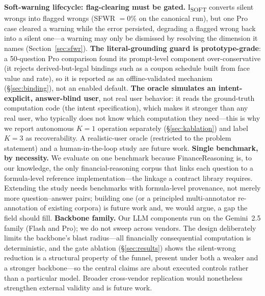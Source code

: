 \textbf{Soft-warning lifecycle: flag-clearing must be gated.} I\textsubscript{SOFT} converts silent wrongs into flagged wrongs (SFWR $=0\%$ on the canonical run), but one Pro case cleared a warning while the error persisted, degrading a flagged wrong back into a silent one---a warning may only be dismissed by resolving the dimension it names (Section~\ref{sec:sfwr}).
\textbf{The literal-grounding guard is prototype-grade}: a 50-question Pro comparison found its prompt-level component over-conservative (it rejects derived-but-legal bindings such as a coupon schedule built from face value and rate), so it is reported as an offline-validated mechanism (\S\ref{sec:binding}), not an enabled default.
\textbf{The oracle simulates an intent-explicit, answer-blind user}, not real user behavior: it reads the ground-truth computation code (the intent specification), which makes it stronger than any real user, who typically does not know which computation they need---this is why we report autonomous $K{=}1$ operation separately (\S\ref{sec:kablation}) and label $K{=}3$ as recoverability. A realistic-user oracle (restricted to the problem statement) and a human-in-the-loop study are future work.
\textbf{Single benchmark, by necessity.} We evaluate on one benchmark because FinanceReasoning is, to our knowledge, the only financial-reasoning corpus that links each question to a formula-level reference implementation---the linkage a contract library requires. Extending the study needs benchmarks with formula-level provenance, not merely more question--answer pairs; building one (or a principled multi-annotator re-annotation of existing corpora) is future work and, we would argue, a gap the field should fill.
\textbf{Backbone family.} Our LLM components run on the Gemini~2.5 family (Flash and Pro); we do not sweep across vendors. The design deliberately limits the backbone's blast radius---all financially consequential computation is deterministic, and the gate ablation (\S\ref{sec:results}) shows the silent-wrong reduction is a structural property of the funnel, present under both a weaker and a stronger backbone---so the central claims are about executed controls rather than a particular model. Broader cross-vendor replication would nonetheless strengthen external validity and is future work.


